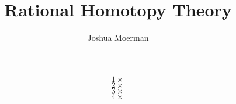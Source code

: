 \documentclass[14pt]{beamer}
\title{Rational Homotopy Theory}
\author{Joshua Moerman}
\institute[Radboud Universiteit Nijmegen]{Supervisor: Ieke Moerdijk}
\date{}
\newcommand{\Frame}[2]{
	\begin{frame}{#1}#2\end{frame}
}
\begin{document}
\Frame{}{
	\[ 1 \times \]
	\[ 2 \times \]
	\[ 3 \times \]
	\[ 4 \times \]
}
\end{document}
